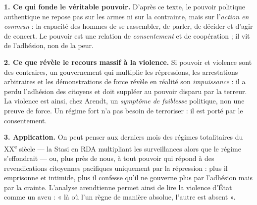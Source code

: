 \documentclass[11pt]{article}
\begin{document}
\begin{corrige}

\textbf{1. Ce qui fonde le véritable pouvoir.} D'après ce texte, le pouvoir politique authentique ne repose pas sur les armes ni sur la contrainte, mais sur l'\emph{action en commun} : la capacité des hommes de se rassembler, de parler, de décider et d'agir de concert. Le pouvoir est une relation de \emph{consentement} et de coopération ; il vit de l'adhésion, non de la peur.

\textbf{2. Ce que révèle le recours massif à la violence.} Si pouvoir et violence sont des contraires, un gouvernement qui multiplie les répressions, les arrestations arbitraires et les démonstrations de force révèle en réalité son \emph{impuissance} : il a perdu l'adhésion des citoyens et doit suppléer au pouvoir disparu par la terreur. La violence est ainsi, chez Arendt, un \emph{symptôme de faiblesse} politique, non une preuve de force. Un régime fort n'a pas besoin de terroriser : il est porté par le consentement.

\textbf{3. Application.} On peut penser aux derniers mois des régimes totalitaires du XX\textsuperscript{e} siècle — la Stasi en RDA multipliant les surveillances alors que le régime s'effondrait — ou, plus près de nous, à tout pouvoir qui répond à des revendications citoyennes pacifiques uniquement par la répression : plus il emprisonne et intimide, plus il confesse qu'il ne gouverne plus par l'adhésion mais par la crainte. L'analyse arendtienne permet ainsi de lire la violence d'État comme un aveu : « là où l'un règne de manière absolue, l'autre est absent ».

\end{corrige}
\end{document}
